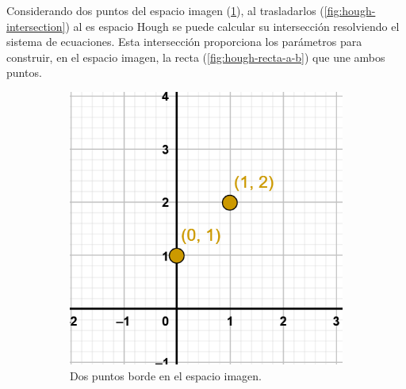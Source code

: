 Considerando dos puntos del espacio imagen (\ref{fig:hough-punto-imagen}), al trasladarlos (\ref{fig:hough-intersection}) al es espacio Hough se puede calcular su intersección resolviendo el sistema de ecuaciones. Esta intersección proporciona los parámetros para construir, en el espacio imagen, la recta (\ref{fig:hough-recta-a-b}) que une ambos puntos.

\begin{figure}
    \centering
    \begin{subfigure}[b]{0.3\textwidth}
        \centering
        \includegraphics[width=\textwidth]{imaxes/c-bases-teoricas/hough-1}
        \caption{Dos puntos borde en el espacio imagen.}
        \label{fig:hough-punto-imagen}
    \end{subfigure}
    \hfill
    \begin{subfigure}[b]{0.3\textwidth}
        \centering

\end{subfigure}
\end{figure}
